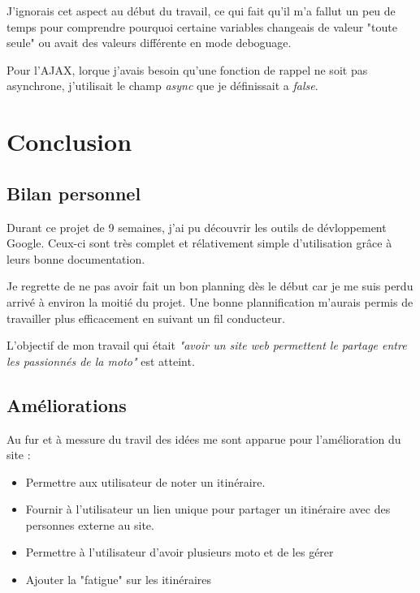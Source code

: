\documentclass[a4paper]{article}
\begin{document}
J'ignorais  cet aspect au début du travail, ce qui fait qu'il m'a fallut un peu de temps pour comprendre pourquoi certaine variables changeais de valeur "toute seule" ou avait des valeurs différente en mode deboguage.

Pour l'AJAX, lorque j'avais besoin qu'une fonction de rappel ne soit pas asynchrone, j'utilisait le champ \emph{async} que je définissait a \emph{false}.

\newpage
\section{Conclusion}
\subsection{Bilan personnel}
Durant ce projet de 9 semaines, j'ai pu découvrir les outils de dévloppement Google. Ceux-ci sont très complet et rélativement simple d'utilisation grâce à leurs bonne documentation. 

Je regrette de ne pas avoir fait un bon planning dès le début car je me suis perdu arrivé à environ la moitié du projet. Une bonne plannification m'aurais permis de travailler plus efficacement en suivant un fil conducteur.

L'objectif de mon travail qui était \emph{"avoir un site web permettent le partage entre les passionnés de la moto"} est atteint.
\subsection{Améliorations }
Au fur et à messure du travil des idées me sont apparue pour l'amélioration du site :
\begin{itemize}
	\item Permettre aux utilisateur de noter un itinéraire.
	\item Fournir à l'utilisateur un lien unique pour partager un itinéraire avec des personnes externe au site.
	\item Permettre à l'utilisateur d'avoir plusieurs moto et de les gérer
	\item Ajouter la "fatigue" sur les itinéraires
\end{itemize}

\pagebreak



\listoffigures
\end{document}
